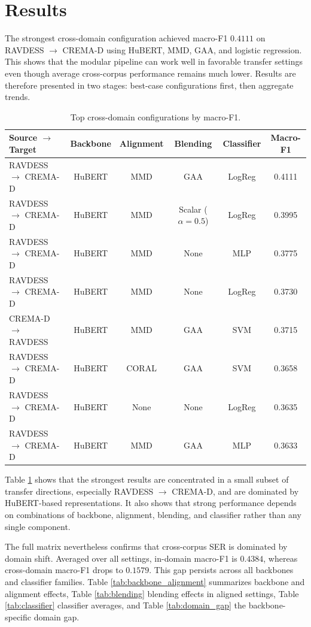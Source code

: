 \documentclass[9pt,twocolumn,letterpaper]{article}
\begin{document}
\section{Results}
The strongest cross-domain configuration achieved macro-F1 $0.4111$ on RAVDESS $\rightarrow$ CREMA-D using HuBERT, MMD, GAA, and logistic regression. This shows that the modular pipeline can work well in favorable transfer settings even though average cross-corpus performance remains much lower. Results are therefore presented in two stages: best-case configurations first, then aggregate trends.

\begin{table}[t]
\centering
\caption{Top cross-domain configurations by macro-F1.}
\label{tab:best_configs}
\footnotesize
\setlength{\tabcolsep}{3pt}
\begin{tabular}{lccccc}
\toprule
Source $\rightarrow$ Target & Backbone & Alignment & Blending & Classifier & Macro-F1 \\
\midrule
RAVDESS $\rightarrow$ CREMA-D & HuBERT & MMD & GAA & LogReg & 0.4111 \\
RAVDESS $\rightarrow$ CREMA-D & HuBERT & MMD & Scalar ($\alpha=0.5$) & LogReg & 0.3995 \\
RAVDESS $\rightarrow$ CREMA-D & HuBERT & MMD & None & MLP & 0.3775 \\
RAVDESS $\rightarrow$ CREMA-D & HuBERT & MMD & None & LogReg & 0.3730 \\
CREMA-D $\rightarrow$ RAVDESS & HuBERT & MMD & GAA & SVM & 0.3715 \\
RAVDESS $\rightarrow$ CREMA-D & HuBERT & CORAL & GAA & SVM & 0.3658 \\
RAVDESS $\rightarrow$ CREMA-D & HuBERT & None & None & LogReg & 0.3635 \\
RAVDESS $\rightarrow$ CREMA-D & HuBERT & MMD & GAA & MLP & 0.3633 \\
\bottomrule
\end{tabular}
\end{table}

Table \ref{tab:best_configs} shows that the strongest results are concentrated in a small subset of transfer directions, especially RAVDESS $\rightarrow$ CREMA-D, and are dominated by HuBERT-based representations. It also shows that strong performance depends on combinations of backbone, alignment, blending, and classifier rather than any single component.

The full matrix nevertheless confirms that cross-corpus SER is dominated by domain shift. Averaged over all settings, in-domain macro-F1 is $0.4384$, whereas cross-domain macro-F1 drops to $0.1579$. This gap persists across all backbones and classifier families. Table \ref{tab:backbone_alignment} summarizes backbone and alignment effects, Table \ref{tab:blending} blending effects in aligned settings, Table \ref{tab:classifier} classifier averages, and Table \ref{tab:domain_gap} the backbone-specific domain gap.
\end{document}

